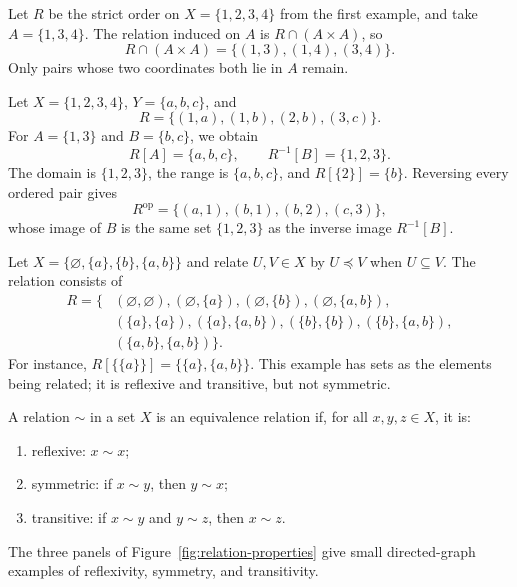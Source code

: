 \begin{example}
Let $R$ be the strict order on $X=\{1,2,3,4\}$ from the first example, and take $A=\{1,3,4\}$. The relation induced on $A$ is $R\cap(A\times A)$, so
\[
  R\cap(A\times A)=\{(1,3),(1,4),(3,4)\}.
\]
Only pairs whose two coordinates both lie in $A$ remain.
\end{example}

\begin{example}
Let $X=\{1,2,3,4\}$, $Y=\{a,b,c\}$, and
\[
  R=\{(1,a),(1,b),(2,b),(3,c)\}.
\]
For $A=\{1,3\}$ and $B=\{b,c\}$, we obtain
\[
  R[A]=\{a,b,c\},\qquad R^{-1}[B]=\{1,2,3\}.
\]
The domain is $\{1,2,3\}$, the range is $\{a,b,c\}$, and $R[\{2\}]=\{b\}$. Reversing every ordered pair gives
\[
  R^{\mathrm{op}}=\{(a,1),(b,1),(b,2),(c,3)\},
\]
whose image of $B$ is the same set $\{1,2,3\}$ as the inverse image $R^{-1}[B]$.
\end{example}

\begin{example}
Let $X=\{\varnothing,\{a\},\{b\},\{a,b\}\}$ and relate $U,V\in X$ by $U\preceq V$ when $U\subseteq V$. The relation consists of
\begin{align*}
R=\{&(\varnothing,\varnothing),(\varnothing,\{a\}),(\varnothing,\{b\}),(\varnothing,\{a,b\}),\\
& (\{a\},\{a\}),(\{a\},\{a,b\}),(\{b\},\{b\}),(\{b\},\{a,b\}),\\
& (\{a,b\},\{a,b\})\}.
\end{align*}
For instance, $R[\{\{a\}\}]=\{\{a\},\{a,b\}\}$. This example has sets as the elements being related; it is reflexive and transitive, but not symmetric.
\end{example}

\begin{definition}
A relation $\sim$ in a set $X$ is an equivalence relation if, for all $x,y,z\in X$, it is:
\begin{enumerate}
    \item reflexive: $x\sim x$;
    \item symmetric: if $x\sim y$, then $y\sim x$;
    \item transitive: if $x\sim y$ and $y\sim z$, then $x\sim z$.
\end{enumerate}
\end{definition}

The three panels of Figure~\ref{fig:relation-properties} give small directed-graph examples of reflexivity, symmetry, and transitivity.


